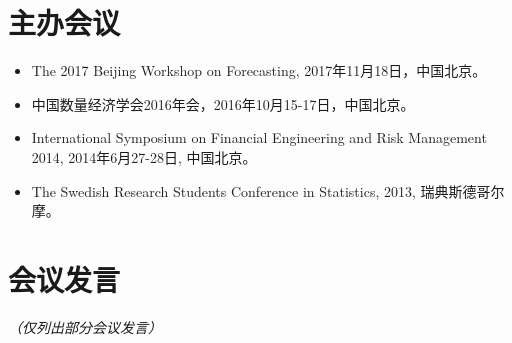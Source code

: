 \documentclass[twoside,a4paper,10pt]{amsart}
\begin{document}
\section*{主办会议}

\begin{itemize}


\item  The 2017 Beijing Workshop on Forecasting, 2017年11月18日，中国北京。
\item 中国数量经济学会2016年会，2016年10月15-17日，中国北京。

\item International Symposium on Financial Engineering and Risk Management 2014,
  2014年6月27-28日, 中国北京。

\item The Swedish Research Students Conference in Statistics, 2013, 瑞典斯德哥尔摩。
\end{itemize}

\section*{会议发言}

\emph{（仅列出部分会议发言）}
\end{document}
